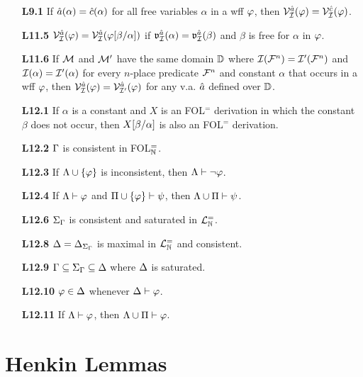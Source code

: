 \documentclass[a4paper, 11pt]{article} %
\begin{document}
\begin{itemize}
  \item[\bf L9.1] If $\hat{a}(\alpha)=\hat{c}(\alpha)$ for all free variables $\alpha$ in a wff $\varphi$, then $\mathcal{V}_{\mathcal{I}}^{\hat{a}}(\varphi)=\mathcal{V}_{\mathcal{I}}^{\hat{c}}(\varphi)$.
  \item[\bf L11.5] $\mathcal{V}_{\mathcal{I}}^{\hat{a}}(\varphi)=\mathcal{V}_{\mathcal{I}}^{\hat{a}}(\varphi[\beta/\alpha])$ if $\mathfrak{v}_{\mathcal{I}}^{\hat{a}}(\alpha)=\mathfrak{v}_{\mathcal{I}}^{\hat{a}}(\beta)$ and $\beta$ is free for $\alpha$ in $\varphi$.
  \item[\bf L11.6] If $\mathcal{M}$ and $\mathcal{M}'$ have the same domain $\mathbb{D}$ where $\mathcal{I}(\mathcal{F}^n)=\mathcal{I}'(\mathcal{F}^n)$ and $\mathcal{I}(\alpha)=\mathcal{I}'(\alpha)$ for every $n$-place predicate $\mathcal{F}^n$ and constant $\alpha$ that occurs in a wff $\varphi$, then $\mathcal{V}_{\mathcal{I}}^{\hat{a}}(\varphi)=\mathcal{V}_{\mathcal{I}'}^{\hat{a}}(\varphi)$ for any v.a. $\hat{a}$ defined over $\mathbb{D}$.
  \item[\bf L12.1] If $\alpha$ is a constant and $X$ is an FOL$^=$ derivation in which the constant $\beta$ does not occur, then $X[\beta/\alpha]$ is also an FOL$^=$ derivation.
  \item[\bf L12.2] $\Gamma$ is consistent in FOL$^=_{\mathbb{N}}$.
  \item[\bf L12.3] If $\Lambda\cup\lbrace\varphi\rbrace$ is inconsistent, then $\Lambda\vdash\neg\varphi$.
  \item[\bf L12.4] If $\Lambda \vdash \varphi$ and $\Pi\cup\lbrace\varphi\rbrace \vdash \psi$, then $\Lambda\cup\Pi \vdash \psi$.
  \item[\bf L12.6] $\Sigma_{\Gamma}$ is consistent and saturated in $\mathcal{L}^{=}_{\mathbb{N}}$.
  \item[\bf L12.8] $\Delta=\Delta_{\Sigma_{\Gamma}}$ is maximal in $\mathcal{L}^{=}_{\mathbb{N}}$ and consistent. 
  \item[\bf L12.9] $\Gamma\subseteq\Sigma_{\Gamma}\subseteq\Delta$ where $\Delta$ is saturated.
  \item[\bf L12.10] $\varphi\in\Delta$ whenever $\Delta\vdash\varphi$.
  \item[\bf L12.11] If $\Lambda\vdash\varphi$, then $\Lambda\cup\Pi\vdash\varphi$.
\end{itemize}





\section*{Henkin Lemmas}
\end{document}
